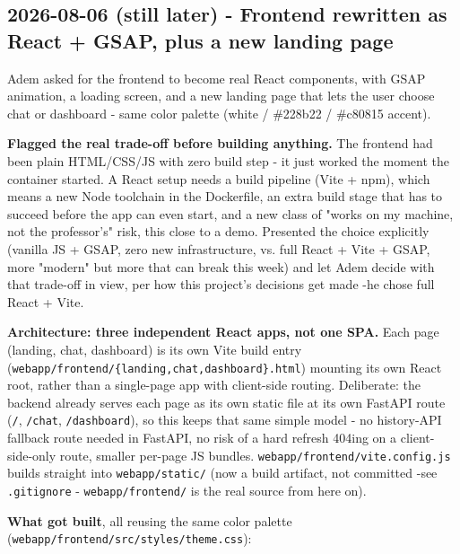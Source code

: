 \subsection*{2026-08-06 (still later) - Frontend rewritten as React + GSAP, plus a new landing page}
Adem asked for the frontend to become real React components, with GSAP animation, a loading screen, and a new landing page that lets the user choose chat or dashboard - same color palette (white / \#228b22 / \#c80815 accent).

\textbf{Flagged the real trade-off before building anything.} The frontend had been plain HTML/CSS/JS with zero build step - it just worked the moment the container started. A React setup needs a build pipeline (Vite + npm), which means a new Node toolchain in the Dockerfile, an extra build stage that has to succeed before the app can even start, and a new class of "works on my machine, not the professor's" risk, this close to a demo. Presented the choice explicitly (vanilla JS + GSAP, zero new infrastructure, vs. full React + Vite + GSAP, more "modern" but more that can break this week) and let Adem decide with that trade-off in view, per how this project's decisions get made -he chose full React + Vite.

\textbf{Architecture: three independent React apps, not one SPA.} Each page (landing, chat, dashboard) is its own Vite build entry (\texttt{webapp/\allowbreak{}frontend/\allowbreak{}\{landing,chat,dashboard\}.html}) mounting its own React root, rather than a single-page app with client-side routing. Deliberate: the backend already serves each page as its own static file at its own FastAPI route (\texttt{/\allowbreak{}}, \texttt{/\allowbreak{}chat}, \texttt{/\allowbreak{}dashboard}), so this keeps that same simple model - no history-API fallback route needed in FastAPI, no risk of a hard refresh 404ing on a client-side-only route, smaller per-page JS bundles. \texttt{webapp/\allowbreak{}frontend/\allowbreak{}vite.config.js} builds straight into \texttt{webapp/\allowbreak{}static/\allowbreak{}} (now a build artifact, not committed -see \texttt{.gitignore} - \texttt{webapp/\allowbreak{}frontend/\allowbreak{}} is the real source from here on).

\textbf{What got built}, all reusing the same color palette (\texttt{webapp/\allowbreak{}frontend/\allowbreak{}src/\allowbreak{}styles/\allowbreak{}theme.css}):

